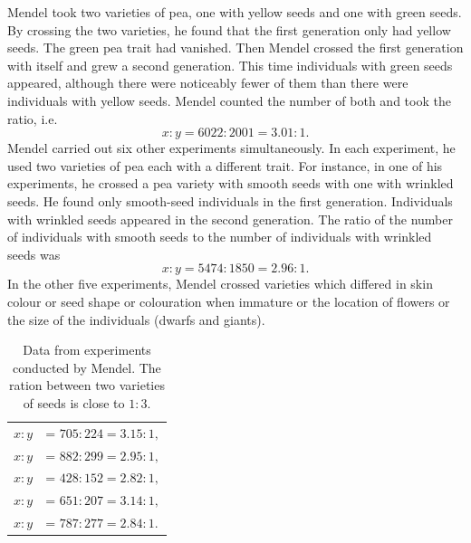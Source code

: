Mendel took two varieties of pea, one with yellow seeds and one with
green seeds. By crossing the two varieties, he found that the first
generation only had yellow seeds. The green pea trait had vanished.
Then Mendel crossed the first generation with itself and grew a second
generation. This time individuals with green seeds appeared, although
there were noticeably fewer of them than there were individuals with
yellow seeds. Mendel counted the number of both and took the ratio,
i.e.
\begin{equation*}%
x:y = 6022:2001 = 3.01:1.
\end{equation*}
Mendel carried out six other experiments simultaneously. In each
experiment, he used two varieties of pea each with a different trait. For
instance, in one of his experiments, he crossed a pea variety with smooth
seeds with one with wrinkled seeds. He found only smooth-seed
individuals in the first generation. Individuals with wrinkled seeds
appeared in the second generation. The ratio of the number of
individuals with smooth seeds to the number of individuals with
wrinkled seeds was
\begin{equation*}%
x:y = 5474:1850 = 2.96:1.
\end{equation*}
In the other five experiments, Mendel crossed varieties which differed
in skin colour or seed shape or colouration when immature or the
location of flowers or the size of the individuals (dwarfs and giants).

\begin{table}
\begin{tabular}{ll}%
$x:y$ & = $705:224  = 3.15:1,$ \\
$x:y$ & = $882:299  = 2.95:1,$ \\
$x:y$ & = $428:152  = 2.82:1,$ \\
$x:y$ & = $651:207 = 3.14:1,$ \\
$x:y$ & = $787:277  = 2.84:1.$
\end{tabular}
\caption{Data from experiments conducted by Mendel. The ration between two varieties of seeds is close to $1:3$.\label{mendel-result}}
\end{table}



